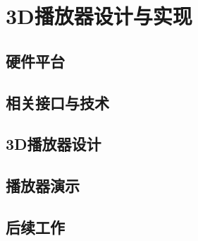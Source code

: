 

\chapter{3D播放器设计与实现}
\label{cha:3Dplayerdesignandrealization}

\section{硬件平台}
\label{sec:3Dplayerhardwareplatform}

\section{相关接口与技术}
\label{sec:3Dplayerapiandtech}

\section{3D播放器设计}
\label{sec:3Dplayerdesign}

\section{播放器演示}
\label{sec:3Dplayerdemo}

\section{后续工作}
\label{sec:3Dplayerfuturework}